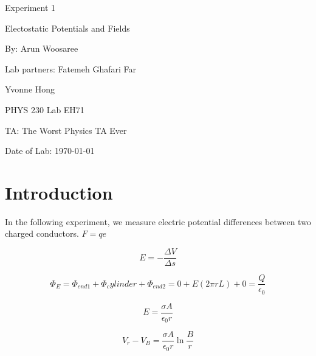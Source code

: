 \documentclass[letterpaper]{article}
\begin{document}
  \begin{titlepage}
    \begin{center}
        \vspace*{1cm}
        \Huge
        Experiment 1
        \vspace{1cm}

        Electostatic Potentials and Fields
        \vspace{1cm}

        By: Arun Woosaree
        \vspace{1cm}

        Lab partners:
        \vspace{.25cm}
        \Large
        Fatemeh Ghafari Far

        Yvonne Hong
        \vspace{1cm}

        \Huge
        PHYS 230 Lab EH71
        \vspace{1cm}

        TA: The Worst Physics TA Ever
        \vspace{1cm}

        Date of Lab: \today
        \vfill
    \end{center}
\end{titlepage}

\section{Introduction}
In the following experiment, we measure electric potential differences between
two charged conductors. $ F=qe$

\begin{equation}
  E=-\frac{\Delta V}{\Delta s}
\end{equation}

\begin{equation}
  \Phi_E = \Phi_{end1} + \Phi_cylinder + \Phi_{end2} = 0+E(2\pi rL) + 0 =\frac{Q}{\epsilon_0}
\end{equation}

\begin{equation}
  E=\frac{\sigma A}{\epsilon_0 r}
\end{equation}

\begin{equation}
  V_r-V_B=\frac{\sigma A}{\epsilon_0 r} \ln{\frac{B}{r}}
\end{equation}
\end{document}
